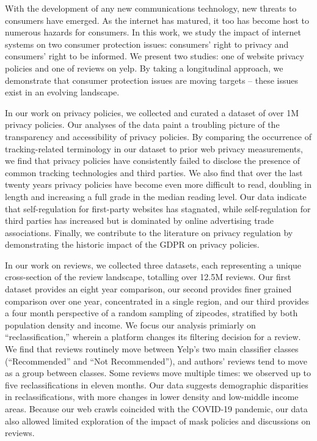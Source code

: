 

With the development of any new communications technology, new threats to consumers have emerged. As the internet has matured, it too has become host to numerous hazards for consumers. In this work, we study the impact of internet systems on two consumer protection issues: consumers' right to privacy and consumers' right to be informed. We present two studies: one of website privacy policies and one of reviews on yelp. By taking a longitudinal approach, we demonstrate that consumer protection issues are moving targets -- these issues exist in an evolving landscape. 

In our work on privacy policies, we collected and curated a dataset of over 1M privacy policies. Our analyses of the data paint a troubling picture of the transparency and accessibility of privacy policies. By comparing the occurrence of tracking-related terminology in our dataset to prior web privacy measurements, we find that privacy policies have consistently failed to disclose the presence of common tracking technologies and third parties. We also find that over the last twenty years privacy policies have become even more difficult to read, doubling in length and increasing a full grade in the median reading level. Our data indicate that self-regulation for first-party websites has stagnated, while self-regulation for third parties has increased but is dominated by online advertising trade associations. Finally, we contribute to the literature on privacy regulation by demonstrating the historic impact of the GDPR on privacy policies.

In our work on reviews, we collected three datasets, each representing a unique cross-section of the review landscape, totalling over 12.5M reviews. Our first dataset provides an eight year comparison, our second provides finer grained comparison over one year, concentrated in a single region, and our third provides a four month perspective of a random sampling of zipcodes, stratified by both population density and income. We focus our analysis primiarly on ``reclassification,'' wherein a platform changes its filtering decision for a review. We find that reviews routinely move between Yelp's two main classifier classes (``Recommended'' and ``Not Recommended''), and authors' reviews tend to move as a group between classes. Some reviews move multiple times: we observed up to five reclassifications in eleven months. Our data suggests demographic disparities in reclassifications, with more changes in lower density and low-middle income areas. Because our web crawls coincided with the COVID-19 pandemic, our data also allowed limited exploration of the impact of mask policies and discussions on reviews.
